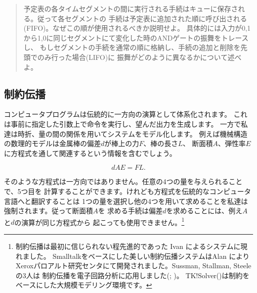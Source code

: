 \begin{quote}
予定表の各タイムセグメントの間に実行される手続はキューに保存される。従って各セグメントの
手続は予定表に追加された順に呼び出される(FIFO)。なぜこの順が使用されるべきか説明せよ。
具体的には入力が0,1から1,0に同じセグメントにて変化した時のANDゲートの振舞をトレースし、
もしセグメントの手続を通常の順に格納し、手続の追加と削除を先頭でのみ行った場合(LIFO)に
振舞がどのように異なるかについて述べよ。
\end{quote}


\subsection{制約伝播}
\label{Section 3.3.5}



コンピュータプログラムは伝統的に一方向の演算として体系化されます。
これは事前に指定した引数上で命令を実行し、望んだ出力を生成します。
一方で私達は時折、量の間の関係を用いてシステムをモデル化します。
例えば機械構造の数理的モデルは金属棒の偏差\( d \)が棒上の力\( F \)、棒の長さ\( L \)、
断面積\( A \)、弾性率\( E \)に方程式を通して関連するという情報を含むでしょう。

\begin{comment}

\begin{example}
dAE = FL
\end{example}

\end{comment}
\begin{displaymath}
 dAE = FL. 
\end{displaymath}


そのような方程式は一方向ではありません。任意の4つの量を与えられることで、5つ目を
計算することができます。けれども方程式を伝統的なコンピュータ言語へと翻訳することは
1つの量を選択し他の4つを用いて求めることを私達は強制されます。従って断面積\( A \)を
求める手続は偏差\( d \)を求めることには、例え\( A \)と\( d \)の演算が同じ方程式から
起こっても使用できません。\footnote{制約伝播は最初に信じられない程先進的であった
Ivan によるシステムに現れました。
Smalltalkをベースにした美しい制約伝播システムはAlan により
Xeroxパロアルト研究センタにて開発されました。Sussman, Stallman, Steeleの3人は
制約伝播を電子回路分析に応用しました(; )。
TK!Solver()は制約をベースにした大規模モデリング環境です。}



